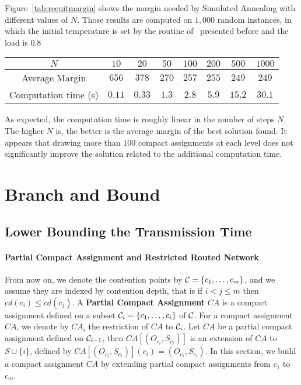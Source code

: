   
Figure~\ref{tab:recuitmargin} shows the margin needed by Simulated Annealing with different values of $N$. Those results are computed on $1,000$ random instances, in which the initial temperature is set by the routine of~\cite{osman1997meta} presented before and the load is $0.8$


\begin{center}
\begin{tabular}{ |c|c|c|c|c|c|c|c| }
\hline
    $N$ & $10$& $20$& $50$ &$100$&$200$& $500$& $1000$\\
    \hline
    Average Margin & $656$& $378$& $270$ &$257$ & $255$& $249$& $249$ \\
    \hline
    Computation time (s)& $0.11$& $0.33$& $1.3$ &$2.8$ & $5.9$& $15.2$& $30.1$\\
    \hline
 \end{tabular}
\end{center}

As expected, the computation time is roughly linear in the number of steps $N$. The higher $N$ is, the better is the average margin of the best solution found. It appears that drawing more than $100$ compact assignments at each level does not significantly improve the solution related to the additional computation time. 

 

\section{Branch and Bound}

\subsection{Lower Bounding the Transmission Time}

\paragraph{Partial Compact Assignment and Restricted Routed Network}

From now on, we denote the contention points by ${\cal C} = \{c_1,\dots, c_m\}$,
and we assume they are indexed by contention depth, that is  if $i < j \leq m$ then  $cd(c_i) \leq cd(c_j)$. 
A \textbf{Partial Compact Assignment} $CA$ is a compact assignment defined on a subset ${\cal C}_i = \{c_1,\ldots,c_i\}$ of ${\cal C}$. For a compact assignment $CA$, we denote by $CA_i$ the restriction of $CA$ to ${\cal C}_i$.
Let $CA$ be a partial compact assignment defined on ${\cal C}_{i-1}$, then $CA[(O_{c_{i}},S_{c_{i}})]$ is an extension of $CA$ to $S \cup \{i\}$, defined by $CA[(O_{c_{i}},S_{c_{i}})](c_i) = (O_{c_{i}},S_{c_{i}})$.
 In this section, we build a compact assignment $CA$ by extending partial compact assignments from $c_1$ to $c_m$.

